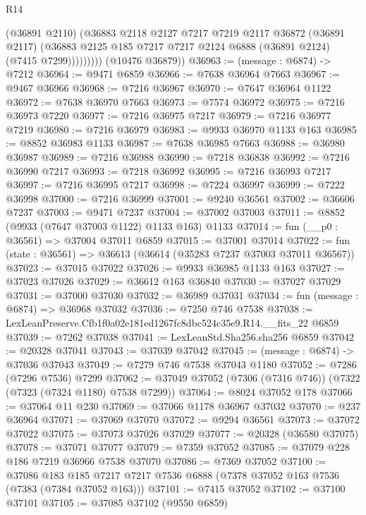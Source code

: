 \begin{lexlean}{R14}
\begin{coremodule}
                  (@36891 @2110)
                  (@36883
                    @2118
                    @2127
                    @7217
                    @7219
                    @2117
                    @36872
                    (@36891 @2117)
                    (@36883 @2125 @185 @7217 @7217 @2124 @6888 (@36891 @2124) (@7415 @7299)))))))))
      (@10476 @36879))
@36963 := (message : @6874) -> @7212
@36964 := @9471 @6859
@36966 := @7638 @36964 @7663
@36967 := @9467 @36966
@36968 := @7216 @36967
@36970 := @7647 @36964 @1122
@36972 := @7638 @36970 @7663
@36973 := @7574 @36972
@36975 := @7216 @36973 @7220
@36977 := @7216 @36975 @7217
@36979 := @7216 @36977 @7219
@36980 := @7216 @36979
@36983 := @9933 @36970 @1133 @163
@36985 := @8852 @36983 @1133
@36987 := @7638 @36985 @7663
@36988 := @36980 @36987
@36989 := @7216 @36988
@36990 := @7218 @36838
@36992 := @7216 @36990 @7217
@36993 := @7218 @36992
@36995 := @7216 @36993 @7217
@36997 := @7216 @36995 @7217
@36998 := @7224 @36997
@36999 := @7222 @36998
@37000 := @7216 @36999
@37001 := @9240 @36561
@37002 := @36606 @7237
@37003 := @9471 @7237
@37004 := @37002 @37003
@37011 := @8852 (@9933 (@7647 @37003 @1122) @1133 @163) @1133
@37014 := fun (__p0 : @36561) => @37004 @37011 @6859
@37015 := @37001 @37014
@37022 := fun (state : @36561) => @36613 (@36614 (@35283 @7237 @37003 @37011 @36567))
@37023 := @37015 @37022
@37026 := @9933 @36985 @1133 @163
@37027 := @37023 @37026
@37029 := @36612 @163 @36840
@37030 := @37027 @37029
@37031 := @37000 @37030
@37032 := @36989 @37031
@37034 := fun (message : @6874) => @36968 @37032
@37036 := @7250 @746 @7538
@37038 := LexLeanPreserve.Cfb1f0a02e181ed1267fc8dbc524c35e9.R14.__fits_22 @6859
@37039 := @7262 @37038
@37041 := LexLeanStd.Sha256.sha256 @6859
@37042 := @20328 @37041
@37043 := @37039 @37042
@37045 := (message : @6874) -> @37036 @37043
@37049 := @7279 @746 @7538 @37043 @1180
@37052 := @7286 (@7296 @7536) @7299
@37062 := @37049 @37052 (@7306 (@7316 @746)) (@7322 (@7323 (@7324 @1180) @7538 @7299))
@37064 := @8024 @37052 @178
@37066 := @37064 @11 @230
@37069 := @37066 @1178 @36967 @37032
@37070 := @237 @36964
@37071 := @37069 @37070
@37072 := @9294 @36561
@37073 := @37072 @37022
@37075 := @37073 @37026 @37029
@37077 := @20328 (@36580 @37075)
@37078 := @37071 @37077
@37079 := @7359 @37052
@37085 := @37079 @228 @186 @7219 @36966 @7538 @37070
@37086 := @7369 @37052
@37100 := @37086
    @183
    @185
    @7217
    @7217
    @7536
    @6888
    (@7378 @37052 @163 @7536 (@7383 (@7384 @37052 @163)))
@37101 := @7415 @37052
@37102 := @37100 @37101
@37105 := @37085 @37102 (@9550 @6859)

\end{coremodule}
\end{lexlean}
